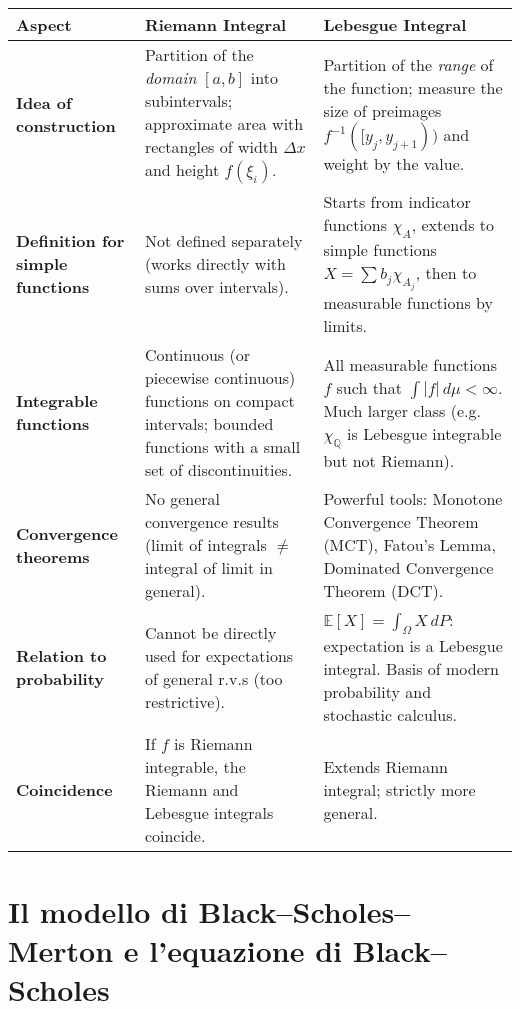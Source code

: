 \documentclass[12pt,a4paper]{book}
\theoremstyle{remark}
\begin{document}
\begin{center}
\renewcommand{\arraystretch}{1.5}
\begin{tabular}{|p{4cm}|p{5cm}|p{5cm}|}
\hline
\textbf{Aspect} & \textbf{Riemann Integral} & \textbf{Lebesgue Integral} \\
\hline
\textbf{Idea of construction} & 
Partition of the \emph{domain} $[a,b]$ into subintervals; approximate area with rectangles of width $\Delta x$ and height $f(\xi_i)$. &
Partition of the \emph{range} of the function; measure the size of preimages $f^{-1}([y_j,y_{j+1}))$ and weight by the value. \\
\hline
\textbf{Definition for simple functions} &
Not defined separately (works directly with sums over intervals). &
Starts from indicator functions $\chi_A$, extends to simple functions $X=\sum b_j \chi_{A_j}$, then to measurable functions by limits. \\
\hline
\textbf{Integrable functions} &
Continuous (or piecewise continuous) functions on compact intervals; bounded functions with a small set of discontinuities. &
All measurable functions $f$ such that $\int |f|\, d\mu < \infty$. Much larger class (e.g. $\chi_\mathbb{Q}$ is Lebesgue integrable but not Riemann). \\
\hline
\textbf{Convergence theorems} &
No general convergence results (limit of integrals $\neq$ integral of limit in general). &
Powerful tools: Monotone Convergence Theorem (MCT), Fatou’s Lemma, Dominated Convergence Theorem (DCT). \\
\hline
\textbf{Relation to probability} &
Cannot be directly used for expectations of general r.v.s (too restrictive). &
\(\mathbb{E}[X]=\int_\Omega X\,dP\): expectation is a Lebesgue integral. Basis of modern probability and stochastic calculus. \\
\hline
\textbf{Coincidence} &
If $f$ is Riemann integrable, the Riemann and Lebesgue integrals coincide. &
Extends Riemann integral; strictly more general. \\
\hline
\end{tabular}
\end{center}







\newpage
\section{Il modello di Black--Scholes--Merton e l'equazione di Black--Scholes}
\label{sec:bsm-bs}
\end{document}
